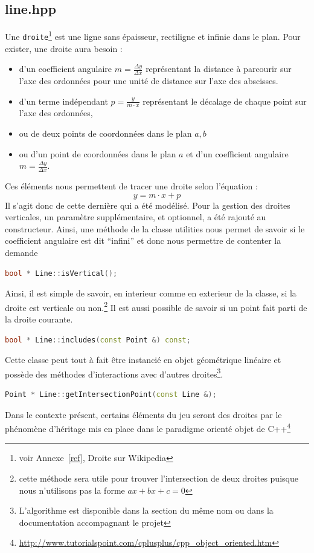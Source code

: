\documentclass[a4paper,11pt]{report}
\begin{document}
\subsection[Droite]{line.hpp}
\begin{center}
\end{center}
Une \texttt{droite}\footnote{voir Annexe~\ref{ref}, Droite sur Wikipedia} est une ligne 
sans épaisseur, rectiligne et infinie dans le plan. Pour exister, une droite aura besoin :
\begin{itemize}
	\item d'un coefficient angulaire $m = \frac{\Delta y}{\Delta x}$
		représentant la distance à parcourir sur l'axe des ordonnées pour une unité de
		distance sur l'axe des abscisses.
	\item d'un terme indépendant $p = \frac{y}{m \cdot x}$ représentant le décalage de chaque point
		sur l'axe des ordonnées,
	\item ou de deux points de coordonnées dans le plan $a, b$
	\item ou d'un point de coordonnées dans le plan $a$ et d'un coefficient
		angulaire $m = \frac{\Delta y}{\Delta x}$.
\end{itemize}
Ces éléments nous permettent de tracer une droite selon l'équation :
$$y = m \cdot x + p$$
Il s'agit donc de cette dernière qui a été modélisé. Pour la gestion des droites
verticales, un paramètre supplémentaire, et optionnel, a été rajouté au
constructeur. Ainsi, une méthode de la classe utilities nous permet de savoir si le
coefficient angulaire est dit ``infini'' et donc nous permettre de contenter la
demande
\begin{lstlisting}[frame=single,language=C++]
bool * Line::isVertical();
\end{lstlisting}
Ainsi, il est simple de savoir, en interieur comme en exterieur de la classe, si
la droite est verticale ou non.\footnote{cette méthode sera utile pour trouver
	l'intersection de deux droites puisque nous n'utilisons pas la forme $ax +
bx + c = 0$} 
Il est aussi possible de savoir si un point fait parti de la droite courante.
\begin{lstlisting}[frame=single,language=C++]
bool * Line::includes(const Point &) const;
\end{lstlisting}
Cette classe peut tout à fait être instancié en objet géométrique linéaire
et possède des méthodes d'interactions avec d'autres droites\footnote{L'algorithme
	est disponible dans la section du même nom ou dans la documentation
accompagnant le projet}.
\begin{lstlisting}[frame=single,language=C++]
Point * Line::getIntersectionPoint(const Line &);
\end{lstlisting}
Dans le contexte présent, certains éléments du jeu seront des droites par le 
phénomène d'héritage mis en place dans le paradigme orienté objet de
C++\footnote{\url{http://www.tutorialspoint.com/cplusplus/cpp_object_oriented.htm}}
\end{document}
